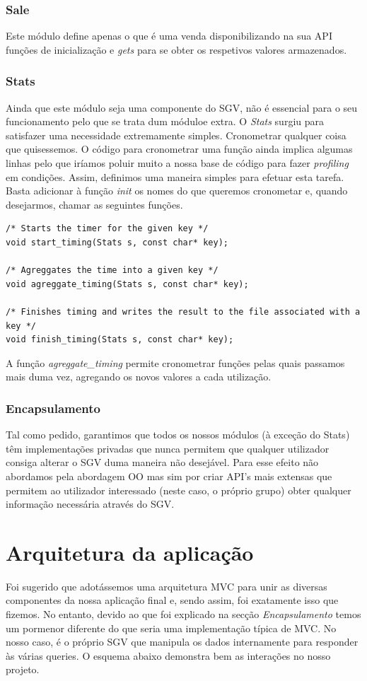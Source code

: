 \documentclass[11pt]{article}
\begin{document}
\subsubsection{Sale}
Este módulo define apenas o que é uma venda disponibilizando na sua API funções de inicialização e \textit{gets} para se obter os respetivos valores armazenados.

\subsubsection{Stats}
Ainda que este módulo seja uma componente do SGV, não é essencial para o seu funcionamento pelo que se trata dum móduloe extra. O \textit{Stats} surgiu para satisfazer uma necessidade extremamente simples. Cronometrar qualquer coisa que quisessemos. O código para cronometrar uma função ainda implica algumas linhas pelo que iríamos poluir muito a nossa base de código para fazer \textit{profiling} em condições. Assim, definimos uma maneira simples para efetuar esta tarefa. Basta adicionar à função \textit{init} os nomes do que queremos cronometar e, quando desejarmos, chamar as seguintes funções.

\begin{verbatim}
/* Starts the timer for the given key */
void start_timing(Stats s, const char* key);

/* Agreggates the time into a given key */
void agreggate_timing(Stats s, const char* key);

/* Finishes timing and writes the result to the file associated with a key */
void finish_timing(Stats s, const char* key);
\end{verbatim}

A função \textit{agreggate\_timing} permite cronometrar funções pelas quais passamos mais duma vez, agregando os novos valores a cada utilização.

\subsubsection{Encapsulamento}
Tal como pedido, garantimos que todos os nossos módulos (à exceção do Stats) têm implementações privadas que nunca permitem que qualquer utilizador consiga alterar o SGV duma maneira não desejável. Para esse efeito não abordamos pela abordagem OO mas sim por criar API's mais extensas que permitem ao utilizador interessado (neste caso, o próprio grupo) obter qualquer informação necessária através do SGV.

\newpage
\section{Arquitetura da aplicação}
Foi sugerido que adotássemos uma arquitetura MVC para unir as diversas componentes da nossa aplicação final e, sendo assim, foi exatamente isso que fizemos. No entanto, devido ao que foi explicado na secção \textit{Encapsulamento} temos um pormenor diferente do que seria uma implementação típica de MVC. No nosso caso, é o próprio SGV que manipula os dados internamente para responder às várias queries. O esquema abaixo demonstra bem as interações no nosso projeto.
\end{document}
